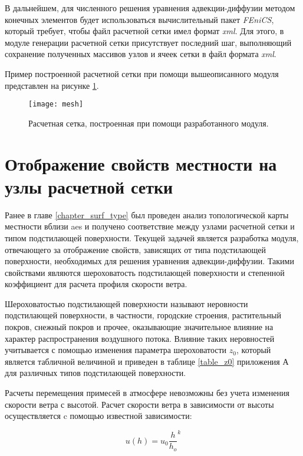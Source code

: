 В дальнейшем, для численного решения уравнения адвекции-диффузии методом конечных элементов будет использоваться 
вычислительный пакет \textit{FEniCS}, который требует, чтобы файл расчетной сетки имел формат \textit{xml}. Для этого, 
в модуле генерации расчетной сетки присутствует последний шаг, выполняющий сохранение полученных массивов узлов и ячеек 
сетки в файл формата \textit{xml}.

Пример построенной расчетной сетки при помощи вышеописанного модуля представлен на рисунке \ref{fig_mesh_img}.

\begin{figure}[ht]
	\centering
	\texttt{[image: mesh]}
	\captionsetup{justification=centering}
    \caption{Расчетная сетка, построенная при помощи разработанного модуля.}
    \label{fig_mesh_img}
\end{figure}

\section{Отображение свойств местности на узлы расчетной сетки}

Ранее в главе \ref{chapter_surf_type} был проведен анализ топологической карты местности вблизи \ac{aes} и получено 
соответствие между узлами расчетной сетки и типом подстилающей поверхности. Текущей задачей является разработка модуля, 
отвечающего за отображение свойств, зависящих от типа подстилающей поверхности, необходимых для решения уравнения 
адвекции-диффузии. Такими свойствами являются шероховатость подстилающей поверхности и степенной коэффициент для 
расчета профиля скорости ветра.

Шероховатостью подстилающей поверхности называют неровности подстилающей поверхности, в частности, городские строения, 
растительный покров, снежный покров и прочее, оказывающие значительное влияние на характер распространения воздушного 
потока. Влияние таких неровностей учитывается с помощью изменения параметра шероховатости $z_0$, который является 
табличной величиной и приведен в таблице \ref{table_z0} приложения А для различных типов подстилающей поверхности.

Расчеты перемещения примесей в атмосфере невозможны без учета изменения скорости ветра с высотой. Расчет скорости 
ветра в зависимости от высоты осуществляется c помощью известной зависимости:

\begin{equation}
    \label{eq_wind_distrib}
    u(h) = u_0 \frac{h}{h_o} ^ k
\end{equation}

